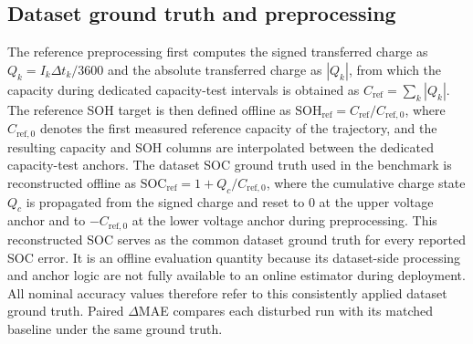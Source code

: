 \documentclass[review,nopreprintline]{elsarticle}
\begin{document}
\subsection{Dataset ground truth and preprocessing}
The reference preprocessing first computes the signed transferred charge as $Q_k = I_k \Delta t_k / 3600$ and the absolute transferred charge as $|Q_k|$, from which the capacity during dedicated capacity-test intervals is obtained as $C_{\mathrm{ref}} = \sum_k |Q_k|$. The reference SOH target is then defined offline as $\mathrm{SOH}_{\mathrm{ref}} = C_{\mathrm{ref}} / C_{\mathrm{ref},0}$, where $C_{\mathrm{ref},0}$ denotes the first measured reference capacity of the trajectory, and the resulting capacity and SOH columns are interpolated between the dedicated capacity-test anchors. The dataset SOC ground truth used in the benchmark is reconstructed offline as $\mathrm{SOC}_{\mathrm{ref}} = 1 + Q_c / C_{\mathrm{ref},0}$, where the cumulative charge state $Q_c$ is propagated from the signed charge and reset to $0$ at the upper voltage anchor and to $-C_{\mathrm{ref},0}$ at the lower voltage anchor during preprocessing. This reconstructed SOC serves as the common dataset ground truth for every reported SOC error. It is an offline evaluation quantity because its dataset-side processing and anchor logic are not fully available to an online estimator during deployment. All nominal accuracy values therefore refer to this consistently applied dataset ground truth. Paired $\Delta$MAE compares each disturbed run with its matched baseline under the same ground truth.
\end{document}
